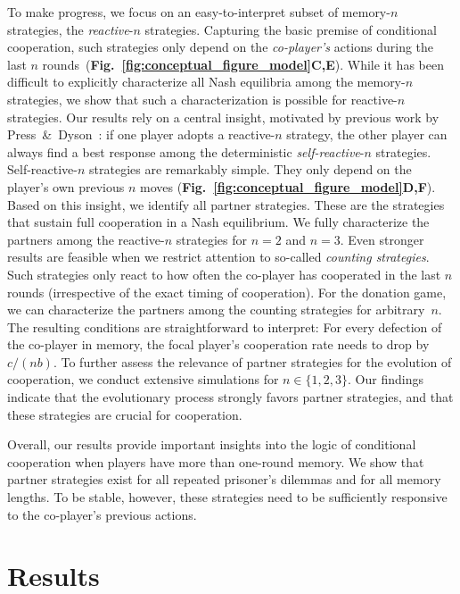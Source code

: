 \documentclass[11pt]{article}
\newcommand{\figref}[1]{{\textbf{Fig.~\ref{#1}}}}
\begin{document}
To make progress, we focus on an easy-to-interpret subset of memory-$n$ strategies, the {\it reactive}-$n$ strategies. 
Capturing the basic premise of conditional cooperation, such strategies only depend on the {\it co-player's} actions during the last $n$ rounds~(\figref{fig:conceptual_figure_model}\textbf{C,E}). 
While it has been difficult to explicitly characterize all Nash equilibria among the memory-$n$ strategies, we show that such a characterization is possible for reactive-$n$ strategies. 
Our results rely on a central insight, motivated by previous work by Press~\&~Dyson~\citep{press:PNAS:2012}: 
if one player adopts a reactive-$n$ strategy, the other player can always find a best response among the deterministic {\it self-reactive}-$n$ strategies. 
Self-reactive-$n$ strategies are remarkably simple. 
They only depend on the player's own previous $n$ moves (\figref{fig:conceptual_figure_model}\textbf{D,F}).
Based on this insight, we identify all partner strategies. 
These are the strategies that sustain full cooperation in a Nash equilibrium. 
We fully characterize the partners among the reactive-$n$ strategies for $n\!=\!2$ and $n\!=\!3$.
Even stronger results are feasible when we restrict attention to so-called {\it counting strategies}.  
Such strategies only react to how often the co-player has cooperated in the last $n$ rounds (irrespective of the exact timing of cooperation). 
For the donation game, we can characterize the partners among the counting strategies for arbitrary~$n$. 
The resulting conditions are straightforward to interpret:
For every defection of the co-player in memory, the focal player's cooperation rate needs to drop by $c/(nb)$.
To further assess the relevance of partner strategies for the evolution of cooperation, we conduct extensive simulations for $n\!\in\!\{1,2,3\}$. 
Our findings indicate that the evolutionary process strongly favors partner strategies, and that these strategies are crucial for cooperation. 

Overall, our results provide important insights into the logic of conditional cooperation when players have more than one-round memory. 
We show that partner strategies exist for all repeated prisoner's dilemmas and for all memory lengths. 
To be stable, however, these strategies need to be sufficiently responsive to the co-player's previous actions. 

\section*{Results}
\end{document}
